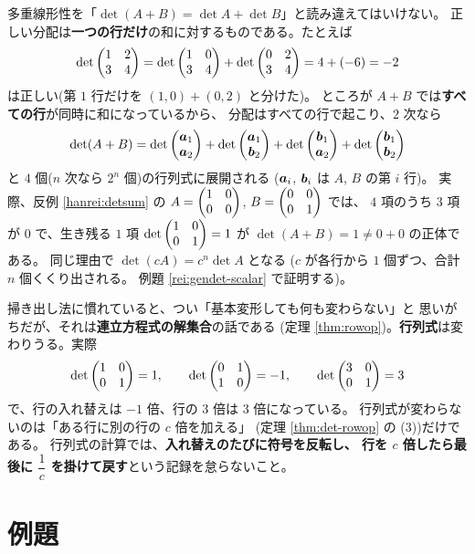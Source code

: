 \begin{hanrei}\label{hanrei:multilin-misuse}
多重線形性を「$\det(A + B) = \det A + \det B$」と読み違えてはいけない。
正しい分配は\textbf{一つの行だけ}の和に対するものである。たとえば
\[
\det \begin{pmatrix}1 & 2 \\ 3 & 4\end{pmatrix}
= \det \begin{pmatrix}1 & 0 \\ 3 & 4\end{pmatrix} + \det \begin{pmatrix}0 & 2 \\ 3 & 4\end{pmatrix}
= 4 + (-6) = -2
\]
は正しい(第 $1$ 行だけを $(1, 0) + (0, 2)$ と分けた)。
ところが $A + B$ では\textbf{すべての行}が同時に和になっているから、
分配はすべての行で起こり、$2$ 次なら
\[
\det(A + B) = \det \begin{pmatrix}\bm{a}_1 \\ \bm{a}_2\end{pmatrix}
+ \det \begin{pmatrix}\bm{a}_1 \\ \bm{b}_2\end{pmatrix}
+ \det \begin{pmatrix}\bm{b}_1 \\ \bm{a}_2\end{pmatrix}
+ \det \begin{pmatrix}\bm{b}_1 \\ \bm{b}_2\end{pmatrix}
\]
と $4$ 個($n$ 次なら $2^n$ 個)の行列式に展開される
($\bm{a}_i$, $\bm{b}_i$ は $A$, $B$ の第 $i$ 行)。
実際、反例 \ref{hanrei:detsum} の
$A = \begin{pmatrix}1 & 0 \\ 0 & 0\end{pmatrix}$, $B = \begin{pmatrix}0 & 0 \\ 0 & 1\end{pmatrix}$ では、
$4$ 項のうち $3$ 項が $0$ で、生き残る $1$ 項
$\det \begin{pmatrix}1 & 0 \\ 0 & 1\end{pmatrix} = 1$ が $\det(A + B) = 1 \neq 0 + 0$ の正体である。
同じ理由で $\det(cA) = c^n \det A$ となる
($c$ が各行から $1$ 個ずつ、合計 $n$ 個くくり出される。
例題 \ref{rei:gendet-scalar} で証明する)。
\end{hanrei}

\begin{hanrei}\label{hanrei:rowop-det}
掃き出し法に慣れていると、つい「基本変形しても何も変わらない」と
思いがちだが、それは\textbf{連立方程式の解集合}の話である
(定理 \ref{thm:rowop})。\textbf{行列式}は変わりうる。実際
\[
\det \begin{pmatrix}1 & 0 \\ 0 & 1\end{pmatrix} = 1, \qquad
\det \begin{pmatrix}0 & 1 \\ 1 & 0\end{pmatrix} = -1, \qquad
\det \begin{pmatrix}3 & 0 \\ 0 & 1\end{pmatrix} = 3
\]
で、行の入れ替えは $-1$ 倍、行の $3$ 倍は $3$ 倍になっている。
行列式が変わらないのは「ある行に別の行の $c$ 倍を加える」
(定理 \ref{thm:det-rowop} の (3))だけである。
行列式の計算では、\textbf{入れ替えのたびに符号を反転し、
行を $c$ 倍したら最後に $\dfrac{1}{c}$ を掛けて戻す}という記録を怠らないこと。
\end{hanrei}

\section{例題}

